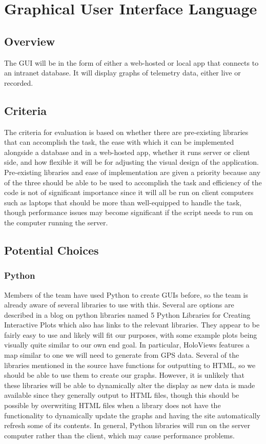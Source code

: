 \documentclass[onecolumn, draftclsnofoot,10pt, compsoc]{IEEEtran}
\begin{document}
\section{Graphical User Interface Language}
\subsection{Overview}
The GUI will be in the form of either a web-hosted or local app that connects to an intranet database. It will display graphs of telemetry data, either live or recorded.
\subsection{Criteria}
The criteria for evaluation is based on whether there are pre-existing libraries that can accomplish the task, the ease with which it can be implemented alongside a database and in a web-hosted app, whether it runs server or client side, and how flexible it will be for adjusting the visual design of the application. Pre-existing libraries and ease of implementation are given a priority because any of the three should be able to be used to accomplish the task and efficiency of the code is not of significant importance since it will all be run on client computers such as laptops that should be more than well-equipped to handle the task, though performance issues may become significant if the script needs to run on the computer running the server.
\subsection{Potential Choices}
\subsubsection{Python}
Members of the team have used Python to create GUIs before, so the team is already aware of several libraries to use with this. Several are options are described in a blog on python libraries named 5 Python Libraries for Creating Interactive Plots\cite{site1} which also has links to the relevant libraries. They appear to be fairly easy to use and likely will fit our purposes, with some example plots being visually quite similar to our own end goal. In particular, HoloViews features a map similar to one we will need to generate from GPS data. Several of the libraries mentioned in the source have functions for outputting to HTML, so we should be able to use them to create our graphs. However, it is unlikely that these libraries will be able to dynamically alter the display as new data is made available since they generally output to HTML files, though this should be possible by overwriting HTML files when a library does not have the functionality to dynamically update the graphs and having the site automatically refresh some of its contents. In general, Python libraries will run on the server computer rather than the client, which may cause performance problems.
\end{document}
